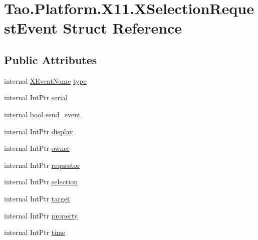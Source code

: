 \hypertarget{struct_tao_1_1_platform_1_1_x11_1_1_x_selection_request_event}{
\section{Tao.Platform.X11.XSelectionRequestEvent Struct Reference}
\label{struct_tao_1_1_platform_1_1_x11_1_1_x_selection_request_event}
}
\subsection*{Public Attributes}
\begin{DoxyCompactItemize}
\item 
internal \hyperlink{namespace_tao_1_1_platform_1_1_x11_aff81ed5b8778e1ea8e872861dff9f146}{XEventName} \hyperlink{struct_tao_1_1_platform_1_1_x11_1_1_x_selection_request_event_aac1311b77f52b72cf30c01b030bfcb60}{type}
\item 
internal IntPtr \hyperlink{struct_tao_1_1_platform_1_1_x11_1_1_x_selection_request_event_ac2c9f59920a09b34b7e2be068c729edb}{serial}
\item 
internal bool \hyperlink{struct_tao_1_1_platform_1_1_x11_1_1_x_selection_request_event_a65d03511c49e095c48667c95addd9200}{send\_\-event}
\item 
internal IntPtr \hyperlink{struct_tao_1_1_platform_1_1_x11_1_1_x_selection_request_event_a9c566a379d798fa1e2c8f94ea88c9fbb}{display}
\item 
internal IntPtr \hyperlink{struct_tao_1_1_platform_1_1_x11_1_1_x_selection_request_event_a1882f5717ce292c7f3db066f0f95f676}{owner}
\item 
internal IntPtr \hyperlink{struct_tao_1_1_platform_1_1_x11_1_1_x_selection_request_event_af7571460492fd6dc97656edaca14ae94}{requestor}
\item 
internal IntPtr \hyperlink{struct_tao_1_1_platform_1_1_x11_1_1_x_selection_request_event_a4f816e7dc080249ce4e0e0c5b64aa227}{selection}
\item 
internal IntPtr \hyperlink{struct_tao_1_1_platform_1_1_x11_1_1_x_selection_request_event_a65f33506b20d5eca4e4371d617599e8d}{target}
\item 
internal IntPtr \hyperlink{struct_tao_1_1_platform_1_1_x11_1_1_x_selection_request_event_a42d17fe564ea80b714693fdcf4541e07}{property}
\item 
internal IntPtr \hyperlink{struct_tao_1_1_platform_1_1_x11_1_1_x_selection_request_event_a719862cd9110ad98fee52340d39ab487}{time}
\end{DoxyCompactItemize}


